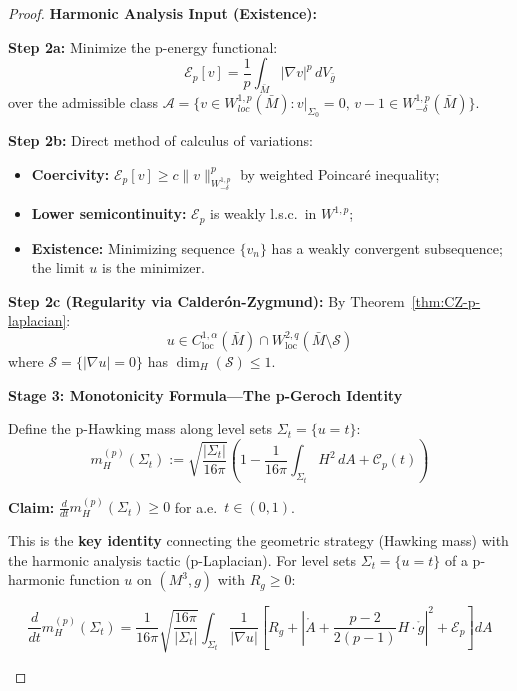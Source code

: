 \begin{proof}
\textbf{Harmonic Analysis Input (Existence):} 

\textbf{Step 2a:} Minimize the p-energy functional:
\begin{equation}
\mathcal{E}_p[v] = \frac{1}{p} \int_{\bar{M}} |\nabla v|^p \, dV_{\bar{g}}
\end{equation}
over the admissible class $\mathcal{A} = \{v \in W^{1,p}_{loc}(\bar{M}) : v|_{\Sigma_0} = 0, \, v - 1 \in W^{1,p}_{-\delta}(\bar{M})\}$.

\textbf{Step 2b:} Direct method of calculus of variations:
\begin{itemize}
\item \textbf{Coercivity:} $\mathcal{E}_p[v] \geq c \|v\|_{W^{1,p}_{-\delta}}^p$ by weighted Poincar\'e inequality;
\item \textbf{Lower semicontinuity:} $\mathcal{E}_p$ is weakly l.s.c.\ in $W^{1,p}$;
\item \textbf{Existence:} Minimizing sequence $\{v_n\}$ has a weakly convergent subsequence; the limit $u$ is the minimizer.
\end{itemize}

\textbf{Step 2c (Regularity via Calder\'on-Zygmund):} By Theorem~\ref{thm:CZ-p-laplacian}:
\begin{equation}
u \in C^{1,\alpha}_{\mathrm{loc}}(\bar{M}) \cap W^{2,q}_{\mathrm{loc}}(\bar{M} \setminus \mathcal{S})
\end{equation}
where $\mathcal{S} = \{|\nabla u| = 0\}$ has $\dim_H(\mathcal{S}) \leq 1$.

\textbf{Stage 3: Monotonicity Formula---The p-Geroch Identity}

Define the p-Hawking mass along level sets $\Sigma_t = \{u = t\}$:
\begin{equation}
m_H^{(p)}(\Sigma_t) := \sqrt{\frac{|\Sigma_t|}{16\pi}} \left(1 - \frac{1}{16\pi} \int_{\Sigma_t} H^2 \, dA + \mathcal{C}_p(t)\right)
\end{equation}

\textbf{Claim:} $\frac{d}{dt} m_H^{(p)}(\Sigma_t) \geq 0$ for a.e.\ $t \in (0,1)$.

\begin{remark}
This is the \textbf{key identity} connecting the geometric strategy (Hawking mass) with the harmonic analysis tactic (p-Laplacian). For level sets $\Sigma_t = \{u = t\}$ of a p-harmonic function $u$ on $(M^3, g)$ with $R_g \geq 0$:

\begin{equation}\label{eq:p-Geroch}
\boxed{
\frac{d}{dt} m_H^{(p)}(\Sigma_t) = \frac{1}{16\pi} \sqrt{\frac{16\pi}{|\Sigma_t|}} \int_{\Sigma_t} \frac{1}{|\nabla u|} \left[ R_g + \left|\mathring{A} + \frac{p-2}{2(p-1)} H \cdot \mathring{g}\right|^2 + \mathcal{E}_p \right] dA
}
\end{equation}


\end{remark}
\end{proof}
